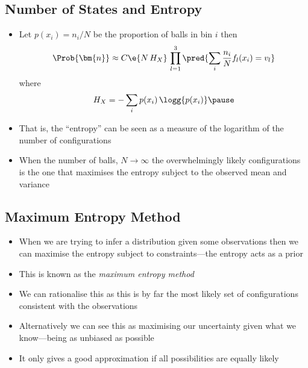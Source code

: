 
\begin{slide}
\section[-2]{Number of States and Entropy}
  
\begin{PauseHighLight}
  \begin{itemize}
  \item Let $p(x_i) = n_i/N$ be the proportion of balls in bin $i$ then
    \begin{align*}
      \Prob{\bm{n}} \approx C \e{N\,H_X} \,  \prod_{l=1}^3 \pred{ \sum_i \frac{n_i}{N} f_l(x_i) = v_l }
    \end{align*}
    where
    \begin{align*}
      H_X = -\sum_{i} p(x_i)\, \logg{p(x_i)}\pause
    \end{align*}
  \item That is, the ``entropy'' can be seen as a measure of the
    logarithm of the number of configurations\pause
  \item When the number of balls, $N\rightarrow\infty$ the
    overwhelmingly likely configurations is the one that maximises the
    entropy subject to the observed mean and variance\pause
  \end{itemize}
\end{PauseHighLight}

\end{slide}


\begin{slide}
\section{Maximum Entropy Method}

\begin{PauseHighLight}
  \begin{itemize}
  \item When we are trying to infer a distribution given some
    observations then we can maximise the entropy subject to
    constraints\pause---the entropy acts as a prior\pauseb
  \item This is known as the \emph{maximum entropy method}\pause
  \item We can rationalise this as this is by far the most likely set
    of configurations consistent with the observations\pause
  \item Alternatively we can see this as maximising our uncertainty
    given what we know\pause---being as unbiased as possible\pauseb
  \item It only gives a good approximation if all possibilities are
    equally likely\pause
  \end{itemize}
\end{PauseHighLight}

\end{slide}

